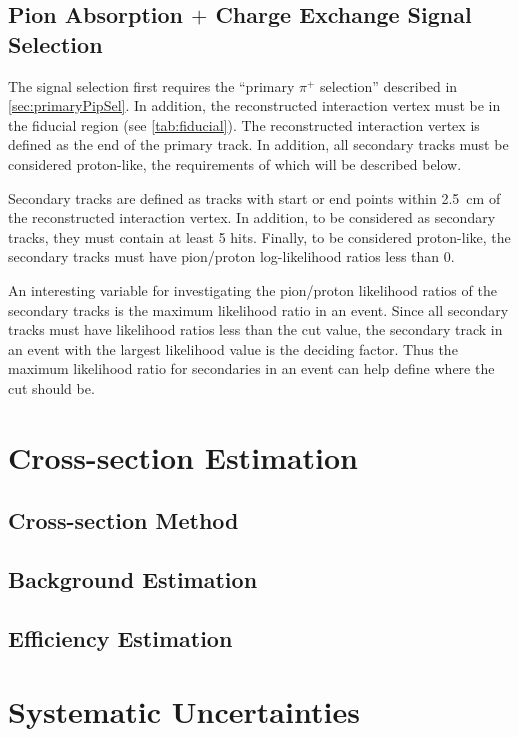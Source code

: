 \documentclass[letterpaper,12pt]{article}
\newcommand{\pip}{\ensuremath{\pi^{+}}}
\begin{document}
\subsection{Pion Absorption $+$ Charge Exchange Signal Selection}
\label{sec:piAbsChExSigSel}

The signal selection first requires the ``primary \pip{} selection'' described
in \cref{sec:primaryPipSel}. In addition, the reconstructed interaction vertex
must be in the fiducial region (see \cref{tab:fiducial}). The reconstructed
interaction vertex is defined as the end of the primary track. In addition, all
secondary tracks must be considered proton-like, the requirements of which will
be described below.

Secondary tracks are defined as tracks with start or end points within
\SI{2.5}{\cm} of the reconstructed interaction vertex. In addition, to be
considered as secondary tracks, they must contain at least 5 hits.
Finally, to be considered proton-like, the secondary tracks must have
pion/proton log-likelihood ratios less than 0.

An interesting variable for investigating the pion/proton likelihood ratios of
the secondary tracks is the maximum likelihood ratio in an event. Since all
secondary tracks must have likelihood ratios less than the cut value, the
secondary track in an event with the largest likelihood value is the deciding
factor. Thus the maximum likelihood ratio for secondaries in an event can help
define where the cut should be.

\section{Cross-section Estimation}

\subsection{Cross-section Method}

\subsection{Background Estimation}

\subsection{Efficiency Estimation}

\section{Systematic Uncertainties}
\end{document}
